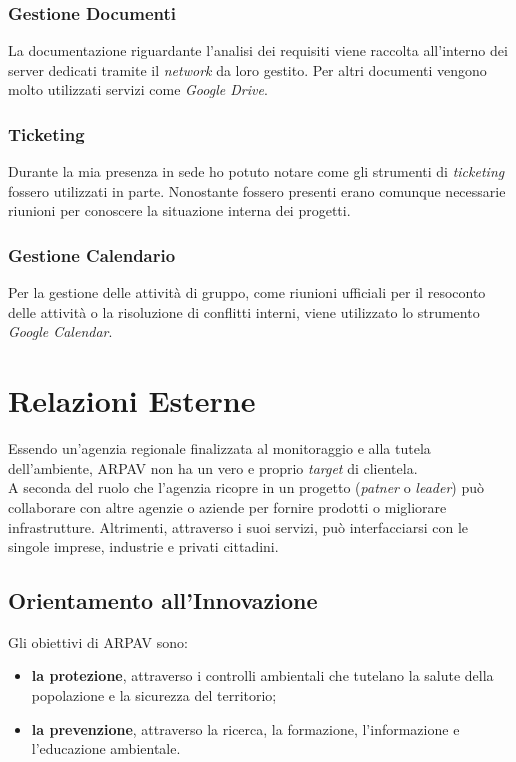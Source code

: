 \subsubsection{Gestione Documenti}
La documentazione riguardante l'analisi dei requisiti viene raccolta all'interno dei server dedicati tramite il \textit{network} da loro gestito. Per altri documenti vengono molto utilizzati servizi come \textit{Google Drive}. 
 


\subsubsection{Ticketing}

Durante la mia presenza in sede ho potuto notare come gli strumenti di \textit{ticketing} fossero utilizzati in parte. Nonostante fossero presenti erano comunque necessarie riunioni per conoscere la situazione interna dei progetti.
\subsubsection{Gestione Calendario}

Per la gestione delle attività di gruppo, come riunioni ufficiali per il resoconto delle attività o la risoluzione di conflitti interni, viene utilizzato lo strumento \textit{Google Calendar}.




\section{Relazioni Esterne}


Essendo un'agenzia regionale finalizzata al monitoraggio e alla tutela dell'ambiente, ARPAV non ha un vero e proprio \textit{target} di clientela. \\
A seconda del ruolo che l'agenzia ricopre in un progetto (\textit{patner} o \textit{leader}) può collaborare con altre agenzie o aziende per fornire prodotti o migliorare infrastrutture. Altrimenti, attraverso i suoi servizi, può interfacciarsi con le singole imprese, industrie e  privati cittadini. 

\subsection{Orientamento all'Innovazione}
Gli obiettivi di ARPAV sono:
\begin{itemize}
	
\item    \textbf{la protezione}, attraverso i controlli ambientali che tutelano la salute della popolazione e la sicurezza del territorio;
\item \textbf{la prevenzione}, attraverso la ricerca, la formazione, l'informazione e l'educazione ambientale.
\end{itemize} 

